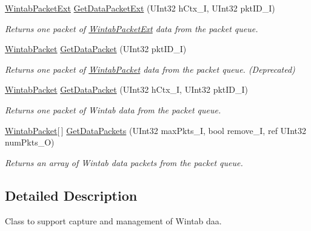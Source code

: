 \begin{DoxyCompactItemize}
\hyperlink{struct_wintab_d_n_1_1_wintab_packet_ext}{WintabPacketExt} \hyperlink{class_wintab_d_n_1_1_c_wintab_data_a49ceefded068a333238b412a725afeff}{GetDataPacketExt} (UInt32 hCtx\_\-I, UInt32 pktID\_\-I)
\begin{DoxyCompactList}\small\item\em Returns one packet of \hyperlink{struct_wintab_d_n_1_1_wintab_packet_ext}{WintabPacketExt} data from the packet queue. \item\end{DoxyCompactList}\item 
\hyperlink{struct_wintab_d_n_1_1_wintab_packet}{WintabPacket} \hyperlink{class_wintab_d_n_1_1_c_wintab_data_a3a4e0655e989c85debdff41b4d83d51b}{GetDataPacket} (UInt32 pktID\_\-I)
\begin{DoxyCompactList}\small\item\em Returns one packet of \hyperlink{struct_wintab_d_n_1_1_wintab_packet}{WintabPacket} data from the packet queue. (Deprecated) \item\end{DoxyCompactList}\item 
\hyperlink{struct_wintab_d_n_1_1_wintab_packet}{WintabPacket} \hyperlink{class_wintab_d_n_1_1_c_wintab_data_a465b6df3b3f753c362d91539ff5245f2}{GetDataPacket} (UInt32 hCtx\_\-I, UInt32 pktID\_\-I)
\begin{DoxyCompactList}\small\item\em Returns one packet of Wintab data from the packet queue. \item\end{DoxyCompactList}\item 
\hyperlink{struct_wintab_d_n_1_1_wintab_packet}{WintabPacket}\mbox{[}$\,$\mbox{]} \hyperlink{class_wintab_d_n_1_1_c_wintab_data_a9ea9c89a0ca7d408d6bb6da822b8be5e}{GetDataPackets} (UInt32 maxPkts\_\-I, bool remove\_\-I, ref UInt32 numPkts\_\-O)
\begin{DoxyCompactList}\small\item\em Returns an array of Wintab data packets from the packet queue. \item\end{DoxyCompactList}\end{DoxyCompactItemize}


\subsection{Detailed Description}
Class to support capture and management of Wintab daa. 

